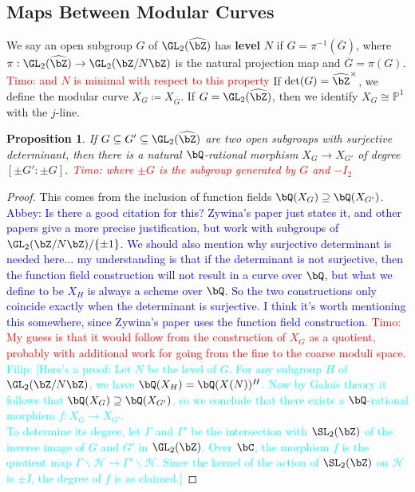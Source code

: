 \documentclass[11pt,reqno]{amsart}
\theoremstyle{plain}
\newtheorem{proposition}[theorem]{Proposition}
\theoremstyle{definition}
\newcommand{\Q}{\bQ}
\newcommand{\Z}{\bZ}
\newcommand{\filip}[1]{{\textcolor{cyan}{Filip: [#1]}}}
\newcommand{\abbey}[1]{\textcolor{blue}{Abbey: #1}}
\newcommand{\timo}[1]{\textcolor{red}{Timo: #1}}
\begin{document}
\subsection{Maps Between Modular Curves} We say an open subgroup $G$ of $\GL_2(\widehat{\Z})$ has \textbf{level} $N$ if $G=\pi^{-1}(\overline{G})$, where $\pi:\GL_2(\widehat{\Z}) \rightarrow \GL_2(\Z/N\Z)$ is the natural projection map and $\overline{G}=\pi(G)$. \timo{and $N$ is minimal with respect to this property} If $\det(G)=\widehat{\Z}^{\times}$, we define the modular curve $X_G \coloneqq X_{\overline{G}}$. If $G=\GL_2(\widehat{\Z})$, then we identify $X_G \cong \mathbb{P}^1$ with the $j$-line.
\begin{proposition} \label{prop:mapdegree}
If $G \subseteq G' \subseteq \GL_2(\widehat{\Z})$ are two open subgroups with surjective determinant, then there is a natural $\Q$-rational morphism $X_G \rightarrow X_{G'}$ of degree $[\pm G': \pm G]$. \timo{where $\pm G$ is the subgroup generated by $G$ and $-I_2$}
\end{proposition}
\begin{proof} This comes from the inclusion of function fields $\Q(X_G) \supseteq \Q(X_{G'})$.
\abbey{ Is there a good citation for this? Zywina's paper just states it, and other papers give a more precise justification, but work with subgroups of $\GL_2(\Z/N\Z)/\{\pm 1\}$. We should also mention why surjective determinant is needed here... my understanding is that if the determinant is not surjective, then the function field construction will not result in a curve over $\Q$, but what we define to be $X_H$ is always a scheme over $\Q$. So the two constructions only coincide exactly when the determinant is surjective. I think it's worth mentioning this somewhere, since Zywina's paper uses the function field construction.} \timo{My guess is that it would follow from the construction of $X_G$ as a quotient, probably with additional work for going from the fine to the coarse moduli space.}\\
\filip{Here's a  proof: Let $N$ be the level of $G$. For any subgroup $H$ of $\GL_2(\Z /N\Z)$, we have $\Q(X_H)=\Q(X(N))^H$. Now by Galois theory it follows that $\Q(X_G) \supseteq \Q(X_{G'})$, so we conclude that there exists a $\Q$-rational morphism $f:X_G \rightarrow X_{G'}$.\\ To determine its degree, let $\Gamma$ and $\Gamma'$ be the intersection with $\SL_2(\Z)$ of the inverse image of $G$ and $G'$ in $\GL_2(\Z)$. Over $\bC$, the morphism $f$ is the quotient map $\Gamma \backslash \mathcal{H} \rightarrow \Gamma' \backslash \mathcal{H}$. Since the kernel of the action of $\SL_2(\Z)$ on $\mathcal H$ is $\pm I$, the degree of $f$ is as claimed.}
    \end{proof}
\end{document}
